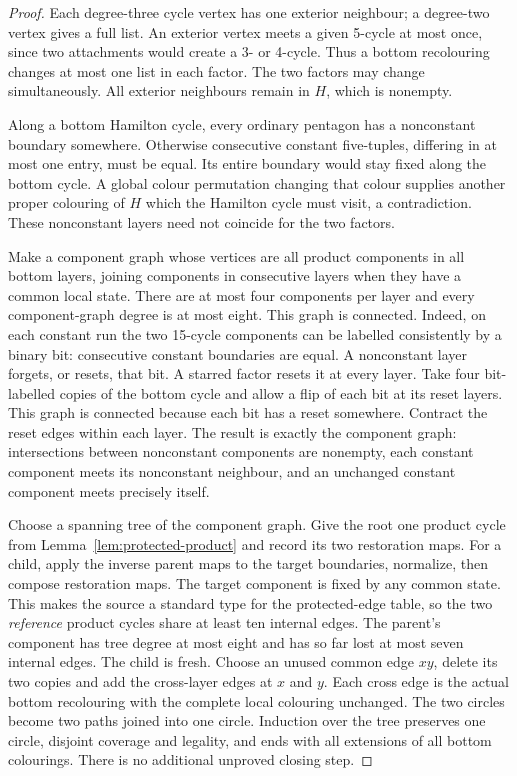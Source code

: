 \documentclass[11pt]{article}
\theoremstyle{remark}
\numberwithin{equation}{section}
\numberwithin{table}{section}
\begin{document}
\begin{proof}
Each degree-three cycle vertex has one exterior neighbour; a
degree-two vertex gives a full list. An exterior vertex meets a
given 5-cycle at most once, since two attachments would create a
3- or 4-cycle. Thus a bottom recolouring changes at most one list
in each factor. The two factors may change simultaneously.
All exterior neighbours remain in $H$, which is nonempty.

Along a bottom Hamilton cycle, every ordinary pentagon has a
nonconstant boundary somewhere. Otherwise consecutive constant
five-tuples, differing in at most one entry, must be equal.
Its entire boundary would stay fixed along the bottom cycle.
A global colour permutation changing that colour supplies another
proper colouring of $H$ which the Hamilton cycle must visit,
a contradiction. These nonconstant layers need not coincide
for the two factors.

Make a component graph whose vertices are all product components
in all bottom layers, joining components in consecutive layers
when they have a common local state. There are at most four components
per layer and every component-graph degree is at most eight.
This graph is connected. Indeed, on each constant run the two
15-cycle components can be labelled consistently by a binary bit:
consecutive constant boundaries are equal. A nonconstant layer
forgets, or resets, that bit. A starred factor resets it at every layer.
Take four bit-labelled copies of the bottom cycle and allow a flip of
each bit at its reset layers. This graph is connected because each
bit has a reset somewhere. Contract the reset edges within each
layer. The result is exactly the component graph: intersections
between nonconstant components are nonempty, each constant component
meets its nonconstant neighbour, and an unchanged constant component
meets precisely itself.

Choose a spanning tree of the component graph. Give the root one
product cycle from Lemma~\ref{lem:protected-product} and record its
two restoration maps. For a child, apply the inverse parent maps
to the target boundaries, normalize, then compose restoration maps.
The target component is fixed by any common state. This makes the
source a standard type for the protected-edge table, so the
two \emph{reference} product cycles share at least ten internal edges.
The parent's component has tree degree at most eight and has so far
lost at most seven internal edges. The child is fresh.
Choose an unused common edge $xy$, delete its two copies and add
the cross-layer edges at $x$ and $y$. Each cross edge is the actual
bottom recolouring with the complete local colouring unchanged.
The two circles become two paths joined into one circle.
Induction over the tree preserves one circle, disjoint coverage and
legality, and ends with all extensions of all bottom colourings.
There is no additional unproved closing step.
\end{proof}
\end{document}
